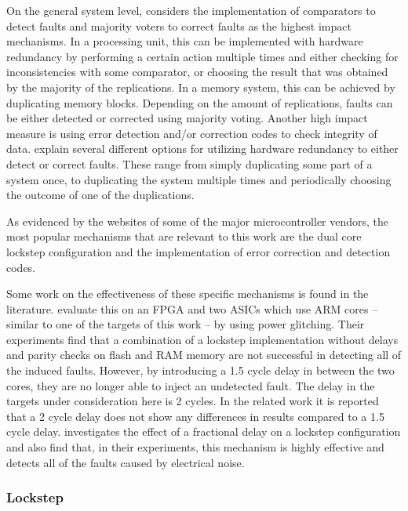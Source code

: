 \documentclass[10pt]{article}
\begin{document}
    On the general system level, \citet{iso26262-5} considers the implementation of comparators to detect faults and majority voters to correct faults as the highest impact mechanisms. 
    In a processing unit, this can be implemented with hardware redundancy by performing a certain action multiple times and either checking for inconsistencies with some comparator, or choosing the result that was obtained by the majority of the replications. 
    In a memory system, this can be achieved by duplicating memory blocks. Depending on the amount of replications, faults can be either detected or corrected using majority voting. Another high impact measure is using error detection and/or correction codes to check integrity of data.
    \citet{bar-el_sorcerers_2006} explain several different options for utilizing hardware redundancy to either detect or correct faults. These range from simply duplicating some part of a system once, to duplicating the system multiple times and periodically choosing the outcome of one of the duplications.

    As evidenced by the websites \cite{ag_products,nxp_mpc564xl,texas_instruments_high,stmicroelectronics_spc5} of some of the major microcontroller vendors, the most popular mechanisms that are relevant to this work are the dual core lockstep configuration and the implementation of error correction and detection codes. 

    Some work on the effectiveness of these specific mechanisms is found in the literature. \citet{tummeltshammer_power_2009} evaluate this on an FPGA and two ASICs which use ARM cores -- similar to one of the targets of this work -- by using power glitching. Their experiments find that a combination of a lockstep implementation without delays and parity checks on flash and RAM memory are not successful in detecting all of the induced faults. However, by introducing a 1.5 cycle delay in between the two cores, they are no longer able to inject an undetected fault. The delay in the targets under consideration here is 2 cycles. In the related work \citet{tummeltshammer_analysis_2009} it is reported that a 2 cycle delay does not show any differences in results compared to a 1.5 cycle delay. \citet{kanekawa_fault_1998} investigates the effect of a fractional delay on a lockstep configuration and also find that, in their experiments, this mechanism is highly effective and detects all of the faults caused by electrical noise.



    \subsubsection{Lockstep }
\end{document}
